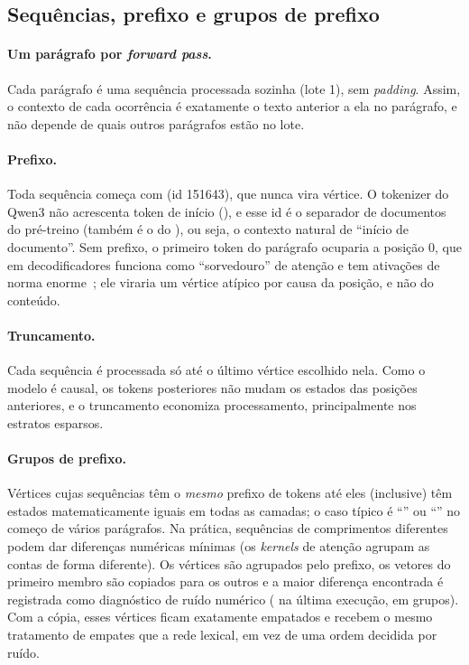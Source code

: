 \subsection{Sequências, prefixo e grupos de prefixo}\label{sec:mod-sequencias}

\paragraph{Um parágrafo por \emph{forward pass}.} Cada parágrafo é uma sequência processada
sozinha (lote 1), sem \emph{padding}. Assim, o contexto de cada ocorrência é exatamente o texto
anterior a ela no parágrafo, e não depende de quais outros parágrafos estão no lote.

\paragraph{Prefixo.} Toda sequência começa com  (id 151643), que nunca vira
vértice. O tokenizer do Qwen3 não acrescenta token de início (),
e esse id é o separador de documentos do pré-treino (também é o  do
), ou seja, o contexto natural de ``início de documento''. Sem prefixo, o
primeiro token do parágrafo ocuparia a posição 0, que em decodificadores funciona como
``sorvedouro'' de atenção e tem ativações de norma enorme~\cite{sun2024}; ele viraria um
vértice atípico por causa da posição, e não do conteúdo.

\paragraph{Truncamento.} Cada sequência é processada só até o último vértice escolhido nela. Como
o modelo é causal, os tokens posteriores não mudam os estados das posições anteriores, e o
truncamento economiza processamento, principalmente nos estratos esparsos.

\paragraph{Grupos de prefixo.} Vértices cujas sequências têm o \emph{mesmo} prefixo de tokens até
eles (inclusive) têm estados matematicamente iguais em todas as camadas; o caso típico é
``'' ou ``'' no começo de vários parágrafos. Na prática, sequências de
comprimentos diferentes podem dar diferenças numéricas mínimas (os \emph{kernels} de atenção
agrupam as contas de forma diferente). Os vértices são agrupados pelo prefixo, os vetores do
primeiro membro são copiados para os outros e a maior diferença encontrada é registrada como
diagnóstico de ruído numérico (\difMaxPrefixo{} na última execução, em \nGruposPrefixo{}
grupos). Com a cópia, esses vértices ficam exatamente empatados e recebem o mesmo tratamento
de empates que a rede lexical, em vez de uma ordem decidida por ruído.

